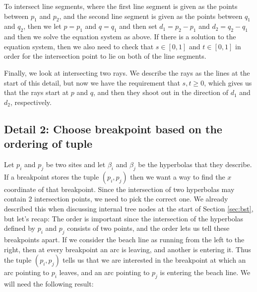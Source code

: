 To intersect line segments, where the first line segment is given as the points between $p_1$ and $p_2$, and the second line segment is given as the points between $q_1$ and $q_2$, then we let $p = p_1$ and $q = q_1$ and then set $d_1 = p_2 - p_1$ and $d_2 = q_2 - q_1$ and then we solve the equation system as above. If there is a solution to the equation system, then we also need to check that $s \in [0, 1]$ and $t \in [0, 1]$ in order for the intersection point to lie on both of the line segments.

Finally, we look at intersecting two rays. We describe the rays as the lines at the start of this detail, but now we have the requirement that $s, t \geq 0$, which gives us that the rays start at $p$ and $q$, and then they shoot out in the direction of $d_1$ and $d_2$, respectively.

\subsection*{Detail 2: Choose breakpoint based on the ordering of tuple}
Let $p_i$ and $p_j$ be two sites and let $\beta_i$ and $\beta_j$ be the hyperbolas that they describe. If a breakpoint stores the tuple $(p_i, p_j)$ then we want a way to find the $x$ coordinate of that breakpoint. Since the intersection of two hyperbolas may contain 2 intersection points, we need to pick the correct one. We already described this when discussing internal tree nodes at the start of Section \ref{sec:bst}, but let's recap: The order is important since the intersection of the hyperbolas defined by $p_i$ and $p_j$ consists of two points, and the order lets us tell these breakpoints apart. If we consider the beach line as running from the left to the right, then at every breakpoint an arc is leaving, and another is entering it. Thus the tuple $(p_i, p_j)$ tells us that we are interested in the breakpoint at which an arc pointing to $p_i$ leaves, and an arc pointing to $p_j$ is entering the beach line. We will need the following result:

